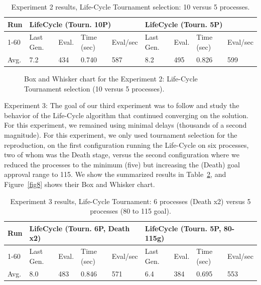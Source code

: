 \documentclass[runningheads]{llncs}
\begin{document}
\begin{table}[]
    \centering        
    \caption{Experiment 2 results, Life-Cycle Tournament selection: 10 versus 5 processes.}\label{tab3}
    \begin{tabular}{|l|l|l|l|l|l|l|l|l|}
    \hline
    Run & \multicolumn{4}{l|}{LifeCycle (Tourn. 10P)} & \multicolumn{4}{l|}{LifeCycle (Tourn. 5P)} \\ \hline
    1-60 & Last Gen. & Eval. & Time (sec) & Eval/sec & Last Gen. & Eval. & Time (sec) & Eval/sec \\ \hline
    Avg. & 7.2 & 434 & 0.740 & 587 & 8.2 & 495 & 0.826 & 599 \\ \hline
    \end{tabular}
    \end{table}

\begin{figure}
    \caption{Box and Whisker chart for the Experiment 2: Life-Cycle Tournament selection (10 versus 5 processes).} \label{fig7}
    \end{figure}


Experiment 3: The goal of our third experiment was to follow and study the
behavior of the Life-Cycle algorithm that continued converging on the solution.
For this experiment, we remained using minimal delays (thousands of a second
magnitude). For this experiment, we only used tournament selection for the
reproduction, on the first configuration running the Life-Cycle on six
processes, two of whom was the Death stage, versus the second configuration
where we reduced the processes to the minimum (five) but increasing the (Death)
goal approval range to 115. We show the summarized results in Table~\ref{tab4}, and
Figure~\ref{fig8} shows their Box and Whisker chart.

\begin{table}[]
    \centering        
    \caption{Experiment 3 results, Life-Cycle Tournament: 6 processes (Death x2) versus 5 processes (80 to 115 goal).}\label{tab4}
    \begin{tabular}{|l|l|l|l|l|l|l|l|l|}
    \hline
    Run & \multicolumn{4}{l|}{LifeCycle (Tourn. 6P, Death x2)} & \multicolumn{4}{l|}{LifeCycle (Tourn. 5P, 80-115g)} \\ \hline
    1-60 & Last Gen. & Eval. & Time (sec) & Eval/sec & Last Gen. & Eval. & Time (sec) & Eval/sec \\ \hline
    Avg. & 8.0 & 483 & 0.846 & 571 & 6.4 & 384 & 0.695 & 553 \\ \hline
    \end{tabular}
    \end{table}
\end{document}
